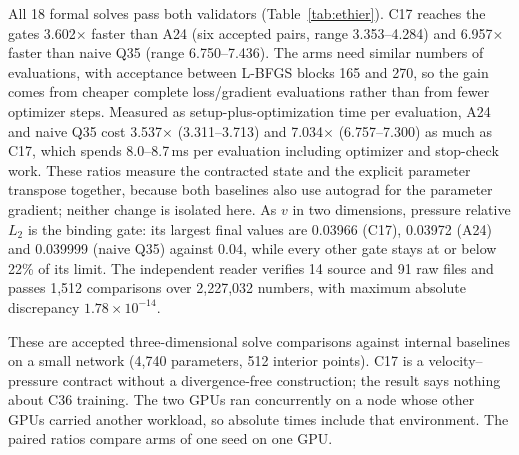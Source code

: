 \documentclass[11pt]{article}
\begin{document}
All 18 formal solves pass both validators (Table~\ref{tab:ethier}). C17
reaches the gates 3.602$\times$ faster than A24 (six accepted pairs, range
3.353--4.284) and 6.957$\times$ faster than naive Q35 (range 6.750--7.436).
The arms need similar numbers of evaluations, with acceptance between
L-BFGS blocks 165 and 270, so the gain comes from cheaper complete
loss/gradient evaluations rather than from fewer optimizer steps. Measured
as setup-plus-optimization time per evaluation, A24 and naive Q35 cost
3.537$\times$ (3.311--3.713) and 7.034$\times$ (6.757--7.300) as much as
C17, which spends 8.0--8.7\,ms per evaluation including optimizer and
stop-check work. These ratios measure the contracted state and the explicit
parameter transpose together, because both baselines also use autograd for
the parameter gradient; neither change is isolated here. As $v$ in
two dimensions, pressure relative $L_2$ is the binding gate: its largest
final values are 0.03966 (C17), 0.03972 (A24) and 0.039999 (naive Q35)
against 0.04, while every other gate stays at or below 22\% of its limit.
The independent reader verifies 14 source and 91 raw files and passes 1,512
comparisons over 2,227,032 numbers, with maximum absolute discrepancy
$1.78\times10^{-14}$.

These are accepted three-dimensional solve comparisons against internal
baselines on a small network (4,740 parameters, 512 interior points). C17
is a velocity--pressure contract without a divergence-free construction;
the result says nothing about C36 training. The two GPUs ran concurrently
on a node whose other GPUs carried another workload, so absolute times
include that environment. The paired ratios compare arms of one seed on
one GPU.
\end{document}
